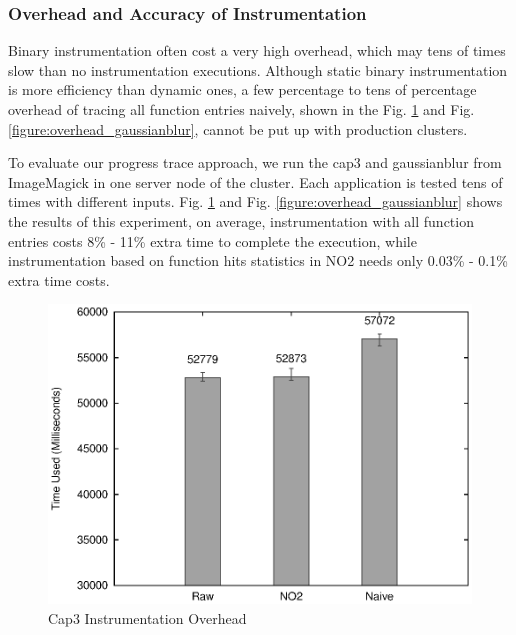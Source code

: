 \subsubsection{Overhead and Accuracy of Instrumentation}

Binary instrumentation often cost a very high overhead, which may tens of times slow than no instrumentation executions. Although static binary instrumentation is more efficiency than dynamic ones, a few percentage to tens of percentage overhead of tracing all function entries naively, shown in the Fig. \ref{figure:overhead_cap3} and Fig. \ref{figure:overhead_gaussianblur}, cannot be put up with production clusters.

To evaluate our progress trace approach, we run the cap3 and gaussianblur from ImageMagick in one server node of the cluster. Each application is tested tens of times with different inputs. Fig. \ref{figure:overhead_cap3} and Fig. \ref{figure:overhead_gaussianblur} shows the results of this experiment, on average, instrumentation with all function entries costs 8\% - 11\% extra time to complete the execution, while instrumentation based on function hits statistics in NO2 needs only 0.03\% - 0.1\% extra time costs.

\begin{figure}
\centering
  \includegraphics[width=0.9\columnwidth]{figures/overhead_cap3.eps}
\caption{Cap3 Instrumentation Overhead}
\label{figure:overhead_cap3}
\end{figure}

